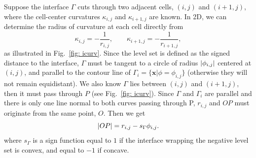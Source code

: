 Suppose the interface $\Gamma$ cuts through two adjacent cells, $(i,j)$ and $(i+1,j)$, where the cell-center curvatures $\kappa_{i,j}$ and $\kappa_{i+1,j}$ are known. In 2D, we can determine the radius of curvature at each cell directly from
\begin{equation}
    \kappa_{i,j} = -\frac{1}{r_{i,j}}, \quad\quad \kappa_{i+1,j} = -\frac{1}{r_{i+1,j}},
  \label{2d curv}
\end{equation}
as illustrated in Fig.\ \ref{fig: icurv}. %
Since the level set is defined as the signed distance to the interface, $\Gamma$ must be tangent to a circle of radius $\lvert\phi_{i,j}\rvert$ centered at $(i,j)$, and parallel to the contour line of $\Gamma_i = \{{\bm x} |\phi=\phi_{i,j}\}$ (otherwise they will not remain equidistant). We also know $\Gamma$ lies between $(i,j)$ and $(i+1,j)$, then it must pass through $P$ (see Fig.\ \ref{fig: icurv}). Since $\Gamma$ and $\Gamma_i$ are parallel and there is only one line normal to both curves passing through P, $r_{i,j}$ and $OP$ must originate from the same point, $O$. Then we get
\begin{equation}
    \lvert OP\rvert = r_{i,j} - s_\Gamma \phi_{i,j}.
  \label{2d curv 1}
\end{equation}
where $s_\Gamma$ is a sign function equal to $1$ if the interface wrapping the negative level set is convex, and equal to $-1$ if concave.

